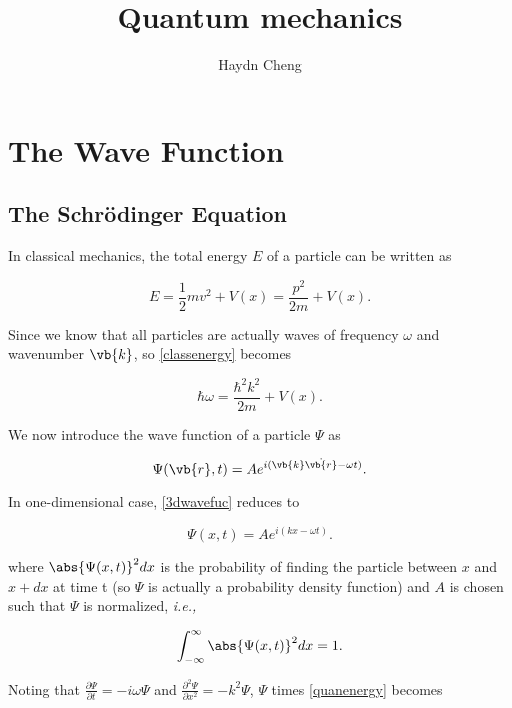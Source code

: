 \documentclass[a4paper,12pt]{report}
\title{Quantum mechanics}
\author{Haydn Cheng}
\date{}
\begin{document}
\maketitle
\tableofcontents
	
\chapter{The Wave Function}
	
\section{The Schrödinger Equation}
	
In classical mechanics, the total energy \(E\) of a particle can be written as 


\begin{equation}
  E=\frac{1}{2} mv^2 + V(x) = \frac{p^2}{2m} + V(x). \label{classenergy}
\end{equation}

Since we know that all particles are actually waves of frequency \(\omega\) and wavenumber \(\vb{k}\), so \cref{classenergy} becomes

\begin{equation} 
  \hbar \omega = \frac{\hbar^2k^2}{2m} + V(x). \label{quanenergy}
\end{equation}

We now introduce the wave function of a particle \(\Psi \) as

\begin{equation}
  \Psi (\vb{r} ,t) = Ae^{i(\vb{k} \dot{\vb{r} } - \omega t )}. \label{3dwavefuc} 
\end{equation}

In one-dimensional case, \cref{3dwavefuc} reduces to

\begin{equation}
  \Psi (x,t) = Ae^{i(kx - \omega t)}. \label{1dwavefuc}  
\end{equation}

where \(\abs{\Psi (x,t)}^2 dx\) is the probability of finding the particle between \(x\) and \(x + dx\) at time t (so \(\Psi\) is actually a probability density function) and \(A\) is chosen such that \(\Psi\) is normalized, \textit{i.e.,} 

\begin{equation}
  \int_{-\infty}^{\infty} \abs{\Psi (x,t)}^2 dx = 1.
\end{equation}

Noting that \(\displaystyle \frac{\partial \Psi }{\partial t} = -i \omega\Psi \) and \(\displaystyle \frac{\partial^2\Psi }{\partial x^2 } = -k^2\Psi \), \(\Psi\) times \cref{quanenergy} becomes
\end{document}

